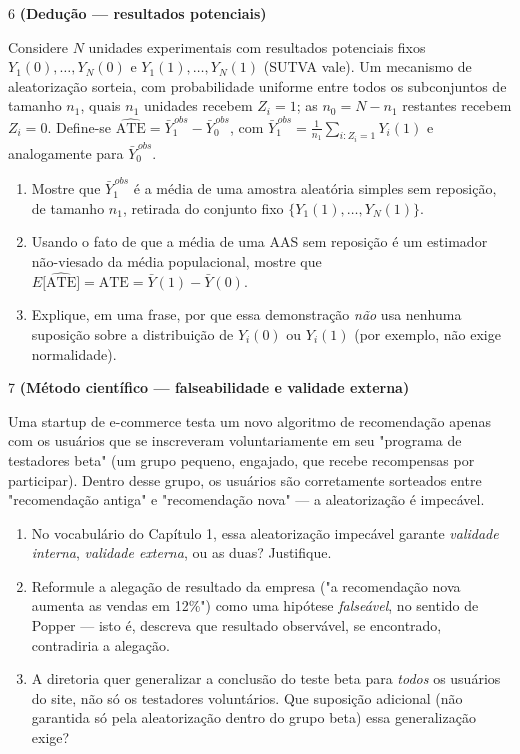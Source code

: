\documentclass[11pt]{article}
\begin{document}
\begin{questao}{6} \textbf{(Dedução --- resultados potenciais)}

Considere $N$ unidades experimentais com resultados potenciais fixos $Y_1(0),\dots,Y_N(0)$ e
$Y_1(1),\dots,Y_N(1)$ (SUTVA vale). Um mecanismo de aleatorização sorteia, com probabilidade
uniforme entre todos os subconjuntos de tamanho $n_1$, quais $n_1$ unidades recebem $Z_i=1$; as
$n_0=N-n_1$ restantes recebem $Z_i=0$. Define-se
$\widehat{\text{ATE}} = \bar Y_1^{\,obs} - \bar Y_0^{\,obs}$, com
$\bar Y_1^{\,obs} = \tfrac{1}{n_1}\sum_{i:Z_i=1} Y_i(1)$ e analogamente para $\bar Y_0^{\,obs}$.

\begin{enumerate}[label=(\alph*)]
  \item Mostre que $\bar Y_1^{\,obs}$ é a média de uma amostra aleatória simples sem reposição, de
    tamanho $n_1$, retirada do conjunto fixo $\{Y_1(1),\dots,Y_N(1)\}$.
  \item Usando o fato de que a média de uma AAS sem reposição é um estimador não-viesado da média
    populacional, mostre que $E\big[\widehat{\text{ATE}}\big] = \text{ATE} = \bar Y(1) - \bar Y(0)$.
  \item Explique, em uma frase, por que essa demonstração \emph{não} usa nenhuma suposição sobre a
    distribuição de $Y_i(0)$ ou $Y_i(1)$ (por exemplo, não exige normalidade).
\end{enumerate}
\end{questao}

\begin{questao}{7} \textbf{(Método científico --- falseabilidade e validade externa)}

Uma startup de e-commerce testa um novo algoritmo de recomendação apenas com os usuários que se
inscreveram voluntariamente em seu "programa de testadores beta" (um grupo pequeno, engajado, que
recebe recompensas por participar). Dentro desse grupo, os usuários são corretamente sorteados
entre "recomendação antiga" e "recomendação nova" — a aleatorização é impecável.

\begin{enumerate}[label=(\alph*)]
  \item No vocabulário do Capítulo 1, essa aleatorização impecável garante \emph{validade
    interna}, \emph{validade externa}, ou as duas? Justifique.
  \item Reformule a alegação de resultado da empresa ("a recomendação nova aumenta as vendas em
    12\%") como uma hipótese \emph{falseável}, no sentido de Popper — isto é, descreva que
    resultado observável, se encontrado, contradiria a alegação.
  \item A diretoria quer generalizar a conclusão do teste beta para \emph{todos} os usuários do
    site, não só os testadores voluntários. Que suposição adicional (não garantida só pela
    aleatorização dentro do grupo beta) essa generalização exige?
\end{enumerate}
\end{questao}
\end{document}
